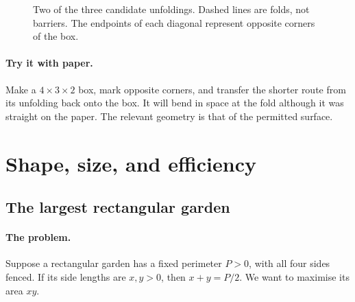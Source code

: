 \begin{figure}[htbp]\centering
{}
\caption{Two of the three candidate unfoldings. Dashed lines are folds, not barriers. The endpoints of each diagonal represent opposite corners of the box.}
\end{figure}

\paragraph{Try it with paper.}
Make a $4\times3\times2$ box, mark opposite corners, and transfer the
shorter route from its unfolding back onto the box. It will bend in space
at the fold although it was straight on the paper. The relevant geometry
is that of the permitted surface.

\section{Shape, size, and efficiency}
\label{sec:geo-efficiency}
\subsection{The largest rectangular garden}
\paragraph{The problem.}
Suppose a rectangular garden has a fixed perimeter $P>0$, with all four
sides fenced. If its side lengths are $x,y>0$, then $x+y=P/2$.
We want to maximise its area $xy$.

